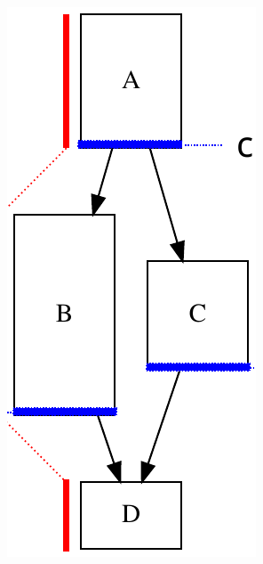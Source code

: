 \documentclass[12pt,dvipdfmx]{beamer}
\begin{document}
\begin{frame}[fragile]
\begin{columns}
\begin{column}{0.3\textwidth}
\begin{center}
\includegraphics[width=\textwidth]{out/pdf/svg/dag_cp.pdf}


\end{center}
\end{column}
\end{columns}
\end{frame}
\end{document}
